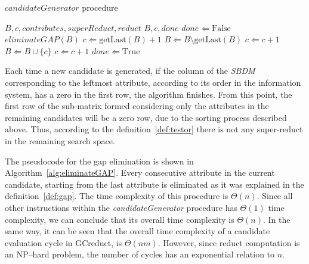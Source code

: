 \documentclass[number,preprint,review,12pt]{elsarticle}
\begin{document}
	\begin{algorithm}
		\footnotesize
		\caption{$candidateGenerator$ procedure}
		\label{alg:CandGenerator}
		\begin{algorithmic}[1]
			\Require \textit{$B,c,contributes,superReduct,reduct$}
			\Ensure $B,c,done$ 
			\State $done \Leftarrow \mathrm{False}$
			\label{line:cg} 
			\label{line:gap} 
			\State $eliminateGAP(B)$
			\EndIf
			\State $c \Leftarrow  \mathrm{getLast}(B)+1$
			\State $B \Leftarrow B\setminus \mathrm{getLast}(B)$\label{line:remLast}
			\Else
			\label{line:NCorSR}
			\State $c \Leftarrow c+1$\label{line:replaceC} 
			\Else
			\State $B \Leftarrow B\cup \lbrace c\rbrace$\label{line:add1} 
			\State $c \Leftarrow c+1$\label{line:add1End} 
			\EndIf
			\EndIf
			 \label{line:done}
			\State $done \Leftarrow \mathrm{True}$
			\EndIf
		\end{algorithmic}
	\end{algorithm}
	
	Each time a new candidate is generated, if the column of the \textit{SBDM} corresponding to the leftmost attribute, according to its order in the information system, has a zero in the first row, the algorithm finishes. From this point, the first row of the sub-matrix formed considering only the attributes in the remaining candidates will be a zero row, due to the sorting process described above. Thus, according to the definition~\ref{def:testor} there is not any super-reduct in the remaining search space.
	
	The pseudocode for the gap elimination is shown in Algorithm~\ref{alg:eliminateGAP}. Every consecutive attribute in the current candidate, starting from the last attribute is eliminated as it was explained in the definition~\ref{def:gap}. The time complexity of this procedure is $\Theta(n)$. Since all other instructions within the \textit{candidateGenerator} procedure has $\Theta(1)$ time complexity, we can conclude that its overall time complexity is $\Theta(n)$. In the same way, it can be seen that the overall time complexity of a candidate evaluation cycle in GCreduct, is $\Theta(nm)$. However, since reduct computation is an NP--hard problem, the number of cycles has an exponential relation to $n$.
\end{document}
